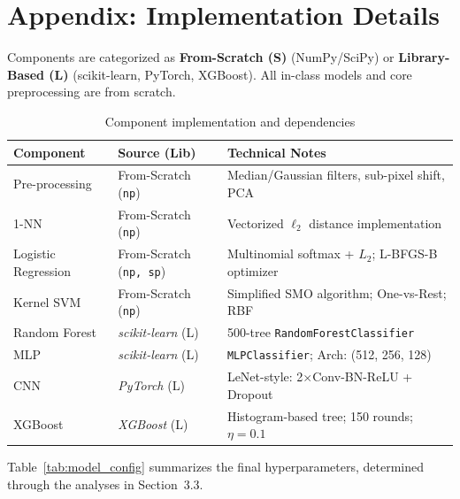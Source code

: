 \documentclass[11pt,a4paper]{article}
\begin{document}
\newpage
\appendix
\section*{Appendix: Implementation Details}

Components are categorized as \textbf{From-Scratch (S)} (NumPy/SciPy) or \textbf{Library-Based (L)} (scikit-learn, PyTorch, XGBoost). All in-class models and core preprocessing are from scratch.

\begin{table}[H]
    \centering
    \renewcommand{\arraystretch}{1.1}
    \small
    \caption{Component implementation and dependencies}
    \label{tab:impl_source}
    \begin{tabular}{lll}
        \toprule
        \textbf{Component} & \textbf{Source (Lib)} & \textbf{Technical Notes} \\
        \midrule
        Pre-processing      & From-Scratch (\texttt{np})   & Median/Gaussian filters, sub-pixel shift, PCA \\
        1-NN                & From-Scratch (\texttt{np})   & Vectorized $\ell_2$ distance implementation \\
        Logistic Regression & From-Scratch (\texttt{np, sp}) & Multinomial softmax + $L_2$; L-BFGS-B optimizer \\
        Kernel SVM          & From-Scratch (\texttt{np})   & Simplified SMO algorithm; One-vs-Rest; RBF \\
        Random Forest       & \textit{scikit-learn} (L)    & 500-tree \texttt{RandomForestClassifier} \\
        MLP                 & \textit{scikit-learn} (L)    & \texttt{MLPClassifier}; Arch: (512, 256, 128) \\
        CNN                 & \textit{PyTorch} (L)         & LeNet-style: 2$\times$Conv-BN-ReLU + Dropout \\
        XGBoost             & \textit{XGBoost} (L)         & Histogram-based tree; 150 rounds; $\eta=0.1$ \\
        \bottomrule
    \end{tabular}
\end{table}

Table~\ref{tab:model_config} summarizes the final hyperparameters, determined through the analyses in Section~3.3.
\end{document}
